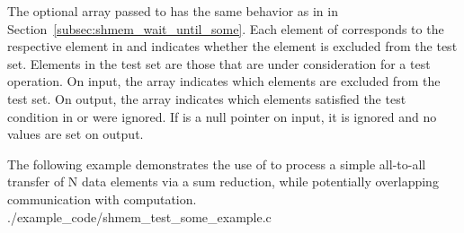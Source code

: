 \begin{apidefinition}
{    The optional  array passed to  has the
    same behavior as in  in
    Section~\ref{subsec:shmem_wait_until_some}.   Each element of 
    corresponds to the respective element in  and indicates whether
    the element is excluded from the test set.  Elements in the test set are
    those that are under consideration for a test operation.  On input, the
     array indicates which elements are excluded from the test set.
    On output, the  array indicates which elements satisfied the
    test condition in  or were ignored.  If  is a null
    pointer on input, it is ignored and no values are set on output.
}



\begin{apiexamples}
  \apicexample
      {The following \CorCpp{} example demonstrates the use of
       to process a simple all-to-all transfer of N
      data elements via a sum reduction, while potentially overlapping
      communication with computation.}
      {./example_code/shmem_test_some_example.c}
      {}
\end{apiexamples}

\end{apidefinition}
